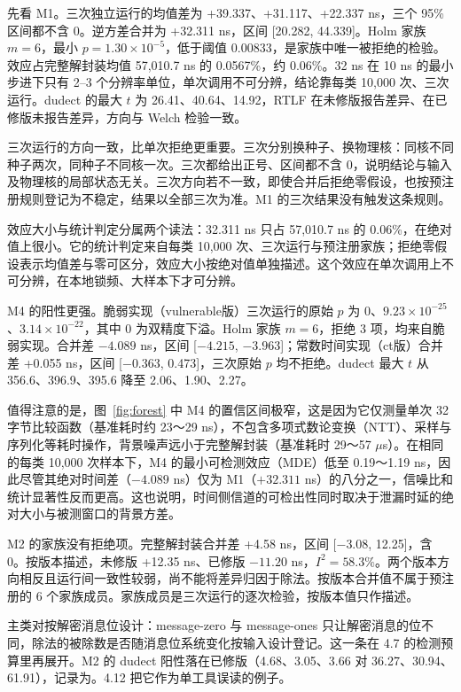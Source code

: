 先看 M1。三次独立运行的均值差为 +39.337、+31.117、+22.337 ns，三个 95\% 区间都不含 0。逆方差合并为 +32.311 ns，区间 [20.282, 44.339]。Holm 家族 $m=6$，最小 $p=1.30\times10^{-5}$，低于阈值 0.00833，是家族中唯一被拒绝的检验。效应占完整解封装均值 57,010.7 ns 的 0.0567\%，约 0.06\%。32 ns 在 10 ns 的最小步进下只有 2--3 个分辨率单位，单次调用不可分辨，结论靠每类 10,000 次、三次运行。dudect 的最大 $t$ 为 26.41、40.64、14.92，RTLF 在未修版报告差异、在已修版未报告差异，方向与 Welch 检验一致。%

三次运行的方向一致，比单次拒绝更重要。三次分别换种子、换物理核：同核不同种子两次，同种子不同核一次。三次都给出正号、区间都不含 0，说明结论与输入及物理核的局部状态无关。三次方向若不一致，即使合并后拒绝零假设，也按预注册规则登记为不稳定，结果以全部三次为准。M1 的三次结果没有触发这条规则。

效应大小与统计判定分属两个读法：32.311 ns 只占 57,010.7 ns 的 0.06\%，在绝对值上很小。它的统计判定来自每类 10,000 次、三次运行与预注册家族；拒绝零假设表示均值差与零可区分，效应大小按绝对值单独描述。这个效应在单次调用上不可分辨，在本地锁频、大样本下才可分辨。

M4 的阳性更强。脆弱实现（vulnerable版）三次运行的原始 $p$ 为 0、$9.23\times10^{-25}$、$3.14\times10^{-22}$，其中 0 为双精度下溢。Holm 家族 $m=6$，拒绝 3 项，均来自脆弱实现。合并差 $-4.089$ ns，区间 [$-4.215$, $-3.963$]；常数时间实现（ct版）合并差 +0.055 ns，区间 [$-0.363$, 0.473]，三次原始 $p$ 均不拒绝。dudect 最大 $t$ 从 356.6、396.9、395.6 降至 2.06、1.90、2.27。%

值得注意的是，图~\ref{fig:forest} 中 M4 的置信区间极窄，这是因为它仅测量单次 32 字节比较函数（基准耗时约 23～29 ns），不包含多项式数论变换（NTT）、采样与序列化等耗时操作，背景噪声远小于完整解封装（基准耗时 29～57 $\mu$s）。在相同的每类 10,000 次样本下，M4 的最小可检测效应（MDE）低至 0.19～1.19 ns，因此尽管其绝对时间差（$-4.089$ ns）仅为 M1（$+32.311$ ns）的八分之一，信噪比和统计显著性反而更高。这也说明，时间侧信道的可检出性同时取决于泄漏时延的绝对大小与被测窗口的背景方差。

M2 的家族没有拒绝项。完整解封装合并差 +4.58 ns，区间 [$-3.08$, 12.25]，含 0。按版本描述，未修版 +12.35 ns、已修版 $-11.20$ ns，$I^2=58.3\%$。两个版本方向相反且运行间一致性较弱，尚不能将差异归因于除法。按版本合并值不属于预注册的 6 个家族成员。家族成员是三次运行的逐次检验，按版本值只作描述。

主类对按解密消息位设计：message-zero 与 message-ones 只让解密消息的位不同，除法的被除数是否随消息位系统变化按输入设计登记。这一条在 4.7 的检测预算里再展开。M2 的 dudect 阳性落在已修版（4.68、3.05、3.66 对 36.27、30.94、61.91），记录为。4.12 把它作为单工具误读的例子。%

